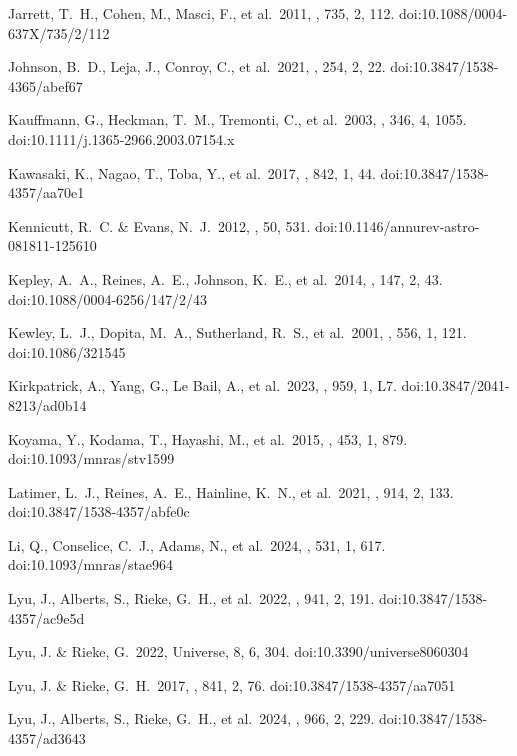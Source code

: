 \documentclass[twocolumn]{aastex63}
\begin{document}
{\begin{thebibliography}{}
{ Jarrett, T.~H., Cohen, M., Masci, F., et al.\ 2011, \apj, 735, 2, 112. doi:10.1088/0004-637X/735/2/112

 Johnson, B.~D., Leja, J., Conroy, C., et al.\ 2021, \apjs, 254, 2, 22. doi:10.3847/1538-4365/abef67

 Kauffmann, G., Heckman, T.~M., Tremonti, C., et al.\ 2003, \mnras, 346, 4, 1055. doi:10.1111/j.1365-2966.2003.07154.x

 Kawasaki, K., Nagao, T., Toba, Y., et al.\ 2017, \apj, 842, 1, 44. doi:10.3847/1538-4357/aa70e1

 Kennicutt, R.~C. \& Evans, N.~J.\ 2012, \araa, 50, 531. doi:10.1146/annurev-astro-081811-125610

 Kepley, A.~A., Reines, A.~E., Johnson, K.~E., et al.\ 2014, \aj, 147, 2, 43. doi:10.1088/0004-6256/147/2/43

 Kewley, L.~J., Dopita, M.~A., Sutherland, R.~S., et al.\ 2001, \apj, 556, 1, 121. doi:10.1086/321545

 Kirkpatrick, A., Yang, G., Le Bail, A., et al.\ 2023, \apjl, 959, 1, L7. doi:10.3847/2041-8213/ad0b14

 Koyama, Y., Kodama, T., Hayashi, M., et al.\ 2015, \mnras, 453, 1, 879. doi:10.1093/mnras/stv1599

 Latimer, L.~J., Reines, A.~E., Hainline, K.~N., et al.\ 2021, \apj, 914, 2, 133. doi:10.3847/1538-4357/abfe0c

 Li, Q., Conselice, C.~J., Adams, N., et al.\ 2024, \mnras, 531, 1, 617. doi:10.1093/mnras/stae964

 Lyu, J., Alberts, S., Rieke, G.~H., et al.\ 2022, \apj, 941, 2, 191. doi:10.3847/1538-4357/ac9e5d

 Lyu, J. \& Rieke, G.\ 2022, Universe, 8, 6, 304. doi:10.3390/universe8060304

 Lyu, J. \& Rieke, G.~H.\ 2017, \apj, 841, 2, 76. doi:10.3847/1538-4357/aa7051

 Lyu, J., Alberts, S., Rieke, G.~H., et al.\ 2024, \apj, 966, 2, 229. doi:10.3847/1538-4357/ad3643

}
\end{thebibliography}}
\end{document}

